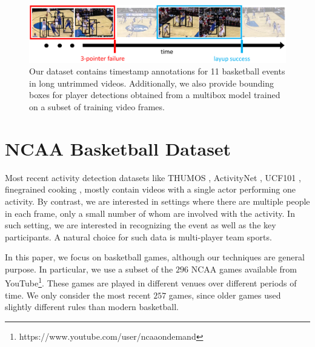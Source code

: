 
\begin{figure}[ht!]
  \includegraphics[width=7 in]{images/dataset_figure_cropped.pdf}
  \caption{Our dataset contains timestamp annotations for 11 basketball events
    in long untrimmed videos. Additionally, we also provide bounding boxes for player
    detections obtained from a multibox model trained on a subset of training
  video frames.}
\end{figure}

\section{NCAA Basketball Dataset}

Most recent activity detection datasets like THUMOS \cite{THUMOS},
ActivityNet \cite{ActivityNet}, UCF101 
\cite{UCF101}, finegrained cooking \cite{Finegrained_cooking},
mostly contain videos with a single actor performing one activity.
By contrast, we are interested in settings where there are multiple
people in each frame, only a small number of whom are involved with
the  activity. In such setting, we are interested in recognizing the event
as well as the key participants. A natural choice for such data is
multi-player team sports.

In this paper, we focus on basketball games, although our techniques
are general purpose.
In particular,  we use a subset of the $296$ NCAA games available from 
YouTube\footnote{https://www.youtube.com/user/ncaaondemand}.  These games are
played in different venues over different periods of time.
We only consider the most recent $257$ games, since older games used
slightly different rules than modern basketball.

